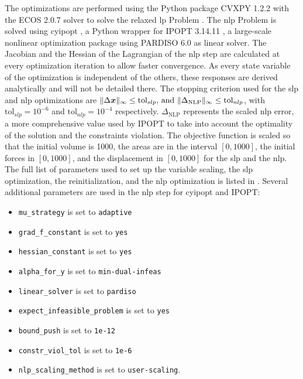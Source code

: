 The optimizations are performed using the Python package CVXPY 1.2.2  with the ECOS 2.0.7  solver to solve the relaxed \gls{lp} Problem . The \gls{nlp} Problem  is solved using cyipopt , a Python wrapper for IPOPT 3.14.11 , a large-scale nonlinear optimization package using PARDISO 6.0  as linear solver. The Jacobian and the Hessian of the Lagrangian of the \gls{nlp} step are calculated at every optimization iteration to allow faster convergence. As every state variable of the optimization is independent of the others, these responses are derived analytically and will not be detailed there. The stopping criterion used for the \gls{slp} and \gls{nlp} optimizations are $\lVert\Delta \bm{x}\rVert_\infty \leq \text{tol}_{slp}  \text{, and } \lVert\Delta_{\text{NLP}}\rVert_\infty \leq \text{tol}_{nlp}$, with $\text{tol}_{slp}=10^{-6}$ and $\text{tol}_{nlp}=10^{-4}$ respectively. $\Delta_{\text{NLP}}$ represents the scaled \gls{nlp} error, a more comprehensive value used by IPOPT to take into account the optimality of the solution and the constraints violation. The objective function is scaled so that the initial volume is 1000, the areas are in the interval $[0,1000]$, the initial forces in $[0,1000]$, and the displacement in $[0,1000]$ for the \gls{slp} and the \gls{nlp}. The full list of parameters used to set up the variable scaling, the \gls{slp} optimization, the reinitialization, and the \gls{nlp} optimization is listed in . Several additional parameters are used in the \gls{nlp} step for cyipopt and IPOPT:
\begin{itemize}
    \item \texttt{mu\_strategy} is set to \texttt{adaptive} 
    \item \texttt{grad\_f\_constant} is set to \texttt{yes} 
    \item \texttt{hessian\_constant} is set to \texttt{yes} 
    \item \texttt{alpha\_for\_y} is set to \texttt{min-dual-infeas}
    \item \texttt{linear\_solver} is set to \texttt{pardiso}
    \item \texttt{expect\_infeasible\_problem} is set to \texttt{yes}
    \item \texttt{bound\_push} is set to \texttt{1e-12}
    \item \texttt{constr\_viol\_tol} is set to \texttt{1e-6}
    \item \texttt{nlp\_scaling\_method} is set to \texttt{user-scaling}.
\end{itemize}

